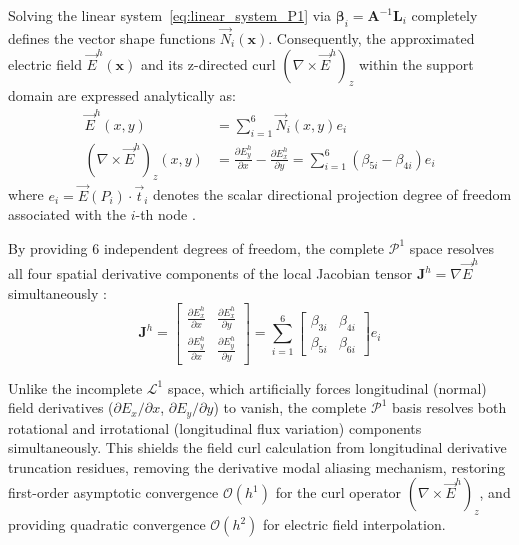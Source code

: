 \documentclass[preprint,12pt]{elsarticle}
\begin{document}
Solving the linear system~\eqref{eq:linear_system_P1} via $\boldsymbol{\beta}_i = \mathbf{A}^{-1} \mathbf{L}_i$ completely defines the vector shape functions $\vec{N}_i(\mathbf{x})$. Consequently, the approximated electric field $\vec{E}^h(\mathbf{x})$ and its z-directed curl $(\nabla \times \vec{E}^h)_z$ within the support domain are expressed analytically as:
\begin{align}
\vec{E}^h(x, y) &= \sum_{i=1}^6 \vec{N}_i(x, y) e_i \label{eq:field_approximation_P1} \\[4pt]
(\nabla \times \vec{E}^h)_z(x, y) &= \frac{\partial E_y^h}{\partial x} - \frac{\partial E_x^h}{\partial y} = \sum_{i=1}^6 (\beta_{5i} - \beta_{4i}) e_i \label{eq:curl_approximation_P1}
\end{align}
where $e_i = \vec{E}(P_i) \cdot \vec{t}_i$ denotes the scalar directional projection degree of freedom associated with the $i$-th node \cite{ortiz2021nodal, goncalves2025tese}.

By providing 6 independent degrees of freedom, the complete $\mathcal{P}^1$ space resolves all four spatial derivative components of the local Jacobian tensor $\mathbf{J}^h = \nabla \vec{E}^h$ simultaneously \cite{nedelec1986new, goncalves2025tese}:
\begin{equation}
\mathbf{J}^h = \begin{bmatrix} 
\frac{\partial E_x^h}{\partial x} & \frac{\partial E_x^h}{\partial y} \\[4pt]
\frac{\partial E_y^h}{\partial x} & \frac{\partial E_y^h}{\partial y} 
\end{bmatrix} = \sum_{i=1}^6 \begin{bmatrix} 
\beta_{3i} & \beta_{4i} \\[4pt]
\beta_{5i} & \beta_{6i}
\end{bmatrix} e_i
\label{eq:full_jacobian_tensor_P1}
\end{equation}

Unlike the incomplete $\mathcal{L}^1$ space, which artificially forces longitudinal (normal) field derivatives ($\partial E_x/\partial x$, $\partial E_y/\partial y$) to vanish, the complete $\mathcal{P}^1$ basis resolves both rotational and irrotational (longitudinal flux variation) components simultaneously. This shields the field curl calculation from longitudinal derivative truncation residues, removing the derivative modal aliasing mechanism, restoring first-order asymptotic convergence $\mathcal{O}(h^1)$ for the curl operator $(\nabla \times \vec{E}^h)_z$, and providing quadratic convergence $\mathcal{O}(h^2)$ for electric field interpolation.
\end{document}
